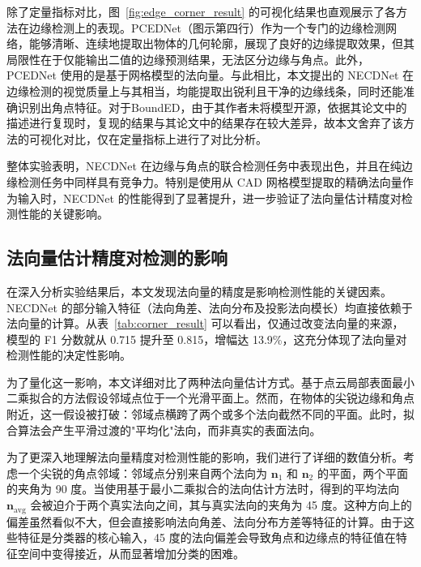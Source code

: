 除了定量指标对比，图~\ref{fig:edge_corner_result} 的可视化结果也直观展示了各方法在边缘检测上的表现。PCEDNet（图示第四行）作为一个专门的边缘检测网络，能够清晰、连续地提取出物体的几何轮廓，展现了良好的边缘提取效果，但其局限性在于仅能输出二值的边缘预测结果，无法区分边缘与角点。此外，PCEDNet 使用的是基于网格模型的法向量。与此相比，本文提出的 NECDNet 在边缘检测的视觉质量上与其相当，均能提取出锐利且干净的边缘线条，同时还能准确识别出角点特征。对于BoundED，由于其作者未将模型开源，依据其论文中的描述进行复现时，复现的结果与其论文中的结果存在较大差异，故本文舍弃了该方法的可视化对比，仅在定量指标上进行了对比分析。

整体实验表明，NECDNet 在边缘与角点的联合检测任务中表现出色，并且在纯边缘检测任务中同样具有竞争力。特别是使用从 CAD 网格模型提取的精确法向量作为输入时，NECDNet 的性能得到了显著提升，进一步验证了法向量估计精度对检测性能的关键影响。


\subsection{法向量估计精度对检测的影响}

在深入分析实验结果后，本文发现法向量的精度是影响检测性能的关键因素。NECDNet 的部分输入特征（法向角差、法向分布及投影法向模长）均直接依赖于法向量的计算。从表~\ref{tab:corner_result} 可以看出，仅通过改变法向量的来源，模型的 F1 分数就从 0.715 提升至 0.815，增幅达 13.9\%，这充分体现了法向量对检测性能的决定性影响。

为了量化这一影响，本文详细对比了两种法向量估计方式。基于点云局部表面最小二乘拟合的方法假设邻域点位于一个光滑平面上。然而，在物体的尖锐边缘和角点附近，这一假设被打破：邻域点横跨了两个或多个法向截然不同的平面。此时，拟合算法会产生平滑过渡的"平均化"法向，而非真实的表面法向。

为了更深入地理解法向量精度对检测性能的影响，我们进行了详细的数值分析。考虑一个尖锐的角点邻域：邻域点分别来自两个法向为 $\mathbf{n}_1$ 和 $\mathbf{n}_2$ 的平面，两个平面的夹角为 90 度。当使用基于最小二乘拟合的法向估计方法时，得到的平均法向 $\mathbf{n}_\text{avg}$ 会被迫介于两个真实法向之间，其与真实法向的夹角为 45 度。这种方向上的偏差虽然看似不大，但会直接影响法向角差、法向分布方差等特征的计算。由于这些特征是分类器的核心输入，45 度的法向偏差会导致角点和边缘点的特征值在特征空间中变得接近，从而显著增加分类的困难。

